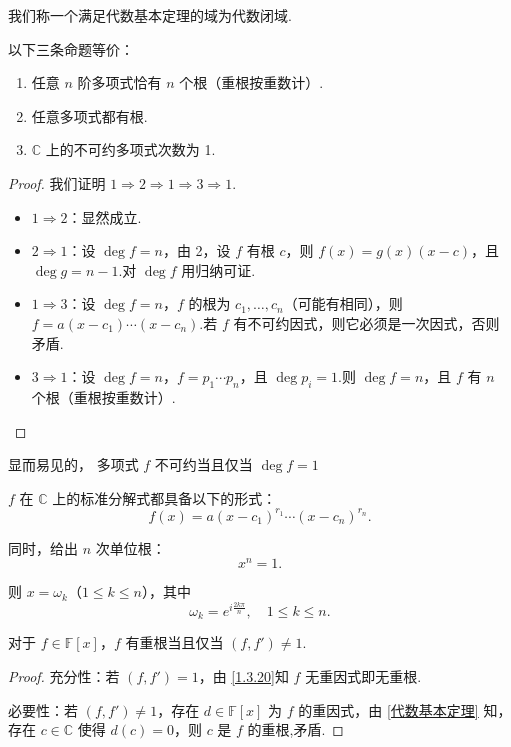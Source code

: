 \label{p1:concept:c1-l1081}我们称一个满足代数基本定理的域为代数闭域.
\begin{proposition}
	以下三条命题等价：
	\begin{enumerate}
		\item 任意 \( n \) 阶多项式恰有 \( n \) 个根（重根按重数计）.
		\item 任意多项式都有根.
		\item \( \mathbb{C} \) 上的不可约多项式次数为 1.
	\end{enumerate}
	
	
\end{proposition}
\begin{proof}
	我们证明 \( 1 \Rightarrow 2 \Rightarrow 1 \Rightarrow 3 \Rightarrow 1 \).
	
	\begin{itemize}
		\item \( 1 \Rightarrow 2 \)：显然成立.
		
		\item \( 2 \Rightarrow 1 \)：设 \( \deg f = n \)，由 2，设 \( f \) 有根 \( c \)，则 \( f(x) = g(x)(x - c) \)，且 \( \deg g = n - 1 \).对 \( \deg f \) 用归纳可证.
		
		\item \( 1 \Rightarrow 3 \)：设 \( \deg f = n \)，\( f \) 的根为 \( c_1, \ldots, c_n \)（可能有相同），则 \( f = a(x - c_1) \cdots (x - c_n) \).若 \( f \) 有不可约因式，则它必须是一次因式，否则矛盾.
		
		\item \( 3 \Rightarrow 1 \)：设 \( \deg f = n \)，\( f = p_1 \cdots p_n \)，且 \( \deg p_i = 1 \).则 \( \deg f = n \)，且 \( f \) 有 \( n \) 个根（重根按重数计）.
	\end{itemize}
\end{proof}

显而易见的，
多项式 \( f \) 不可约当且仅当 \( \deg f = 1 \)

\( f \) 在 \( \mathbb{C} \) 上的标准分解式都具备以下的形式：
\[ f(x) = a(x - c_1)^{r_1} \cdots (x - c_n)^{r_n}. \]

同时，给出 \( n \) 次单位根：
\[ x^n = 1. \]

则 \( x = \omega_k \)（\( 1 \leq k \leq n \)），其中
\[ \omega_k = e^{i\frac{ 2 k \pi}{n}}, \quad 1 \leqslant k \leqslant n.\]

\begin{corollary}
对于 \( f \in \mathbb{F}[x] \)，\( f \) 有重根当且仅当 \( (f, f') \neq 1 \).
\end{corollary}
\begin{proof}
	充分性：若 \( (f, f') = 1 \)，由 \ref{1.3.20}知 \( f \) 无重因式即无重根.
	
	必要性：若 \( (f, f') \neq 1 \)，存在 \( d \in \mathbb{F}[x] \) 为 \( f \) 的重因式，由 \ref{代数基本定理} 知，存在 \( c \in \mathbb{C} \) 使得 \( d(c) = 0 \)，则 \( c \) 是 \( f \) 的重根,矛盾.
	
\end{proof}
